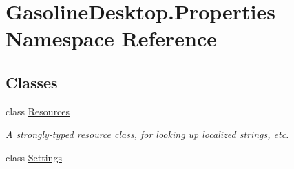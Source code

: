 \hypertarget{namespace_gasoline_desktop_1_1_properties}{}\section{Gasoline\+Desktop.\+Properties Namespace Reference}
\label{namespace_gasoline_desktop_1_1_properties}
\subsection*{Classes}
\begin{DoxyCompactItemize}
\item 
class \mbox{\hyperlink{class_gasoline_desktop_1_1_properties_1_1_resources}{Resources}}
\begin{DoxyCompactList}\small\item\em A strongly-\/typed resource class, for looking up localized strings, etc. \end{DoxyCompactList}\item 
class \mbox{\hyperlink{class_gasoline_desktop_1_1_properties_1_1_settings}{Settings}}
\end{DoxyCompactItemize}
